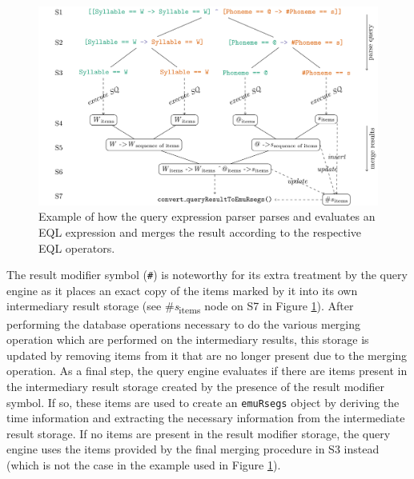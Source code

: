 \documentclass[]{book}
\begin{document}
\begin{figure}

{\centering \includegraphics[width=1\linewidth]{pics/queryParserExample1} 

}

\caption{Example of how the query expression parser parses and evaluates an EQL expression and merges the result according to the respective EQL operators.}\label{fig:query-queryParserExample1}
\end{figure}

The result modifier symbol (\texttt{\#}) is noteworthy for its extra treatment by the query engine as it places an exact copy of the items marked by it into its own intermediary result storage (see \#\emph{s}\textsubscript{items} node on S7 in Figure \ref{fig:query-queryParserExample1}). After performing the database operations necessary to do the various merging operation which are performed on the intermediary results, this storage is updated by removing items from it that are no longer present due to the merging operation. As a final step, the query engine evaluates if there are items present in the intermediary result storage created by the presence of the result modifier symbol. If so, these items are used to create an \texttt{emuRsegs} object by deriving the time information and extracting the necessary information from the intermediate result storage. If no items are present in the result modifier storage, the query engine uses the items provided by the final merging procedure in S3 instead (which is not the case in the example used in Figure \ref{fig:query-queryParserExample1}).
\end{document}
